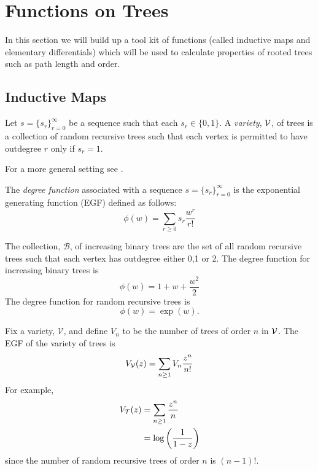 \section{Functions on Trees}\label{sec:func}
In this section we will build up a tool kit of functions (called inductive maps and elementary differentials) which will be used to calculate 
 properties of rooted trees such as path length and order.  
 
\subsection{Inductive Maps}
\begin{defn}
 Let $s = \{ s_r\}_{r=0}^{\infty}$ be a sequence such that each $s_r \in \{0,1\}$.  A \emph{variety}, $\operatorname{\mathcal{V}}$, of trees is a 
 collection of random recursive trees such that each vertex is permitted to have outdegree $r$ only if $s_r = 1$. 
\end{defn}
\begin{remk}
 For a more general setting see \cite{bergeron}.
\end{remk}
The \emph{degree function} associated with a sequence $s= \{ s_r\}_{r=0}^{\infty}$ is the exponential generating function (EGF) defined as follows:
\[
 \phi(w) = \sum_{r \geq 0} s_r \frac{w^r}{r!}
\]

\begin{ex}\label{ex:inductivemaps}
 The collection, $\mathcal{B}$, of increasing binary trees are the set of all random recursive trees such that each vertex has 
 outdegree either 0,1 or 2.  The degree function for increasing binary trees is
 \[
  \phi(w) = 1 + w + \frac{w^2}{2}
 \]
The degree function for random recursive trees is
\[
 \phi(w) = \exp(w).
\]
\end{ex}
Fix a variety, $\mathcal{V}$, and define $V_n$ to be the number of trees of order $n$ in $\operatorname{\mathcal{V}}$.  The EGF of the variety of trees 
is 
\[
 V_{\operatorname{\mathcal{V}}}(z) = \sum_{n \geq 1} V_n \frac{z^n}{n!}
\]
For example, 
\begin{align}
V_{\operatorname{\mathcal{T}}}(z) &= \sum_{n\geq 1} \frac{z^n}{n} \\
&= \log\left( \frac{1}{1-z}\right)
\end{align}
since the number of random recursive trees of order $n$ is $(n-1)!$.

